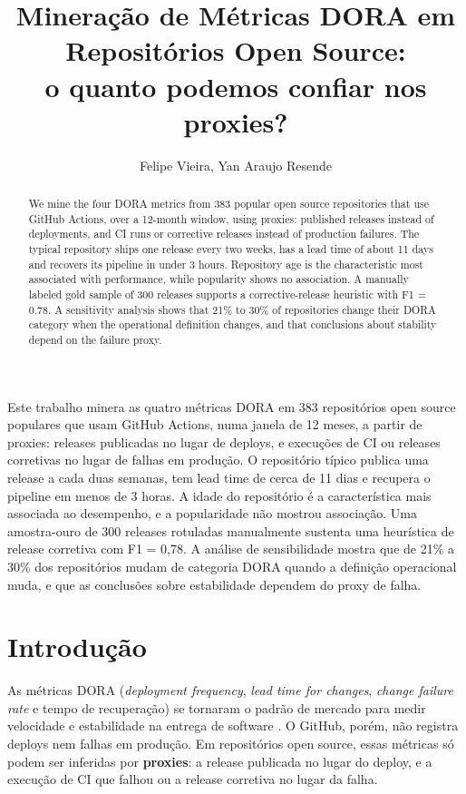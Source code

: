 \documentclass[12pt]{article}
\title{Mineração de Métricas DORA em Repositórios Open Source:\\
o quanto podemos confiar nos proxies?}
\author{Felipe Vieira\inst{1}, Yan Araujo Resende\inst{1}}
\begin{document}
\maketitle

\begin{abstract}
We mine the four DORA metrics from 383 popular open source repositories that use GitHub Actions, over a 12-month window, using proxies: published releases instead of deployments, and CI runs or corrective releases instead of production failures. The typical repository ships one release every two weeks, has a lead time of about 11 days and recovers its pipeline in under 3 hours. Repository age is the characteristic most associated with performance, while popularity shows no association. A manually labeled gold sample of 300 releases supports a corrective-release heuristic with F1 = 0.78. A sensitivity analysis shows that 21\% to 30\% of repositories change their DORA category when the operational definition changes, and that conclusions about stability depend on the failure proxy.
\end{abstract}

\begin{resumo}
Este trabalho minera as quatro métricas DORA em 383 repositórios open source populares que usam GitHub Actions, numa janela de 12 meses, a partir de proxies: releases publicadas no lugar de deploys, e execuções de CI ou releases corretivas no lugar de falhas em produção. O repositório típico publica uma release a cada duas semanas, tem lead time de cerca de 11 dias e recupera o pipeline em menos de 3 horas. A idade do repositório é a característica mais associada ao desempenho, e a popularidade não mostrou associação. Uma amostra-ouro de 300 releases rotuladas manualmente sustenta uma heurística de release corretiva com F1 = 0,78. A análise de sensibilidade mostra que de 21\% a 30\% dos repositórios mudam de categoria DORA quando a definição operacional muda, e que as conclusões sobre estabilidade dependem do proxy de falha.
\end{resumo}

\section{Introdução}

As métricas DORA (\textit{deployment frequency}, \textit{lead time for changes}, \textit{change failure rate} e tempo de recuperação) se tornaram o padrão de mercado para medir velocidade e estabilidade na entrega de software \cite{forsgren2018,dora}. O GitHub, porém, não registra deploys nem falhas em produção. Em repositórios open source, essas métricas só podem ser inferidas por \textbf{proxies}: a release publicada no lugar do deploy, e a execução de CI que falhou ou a release corretiva no lugar da falha.
\end{document}
